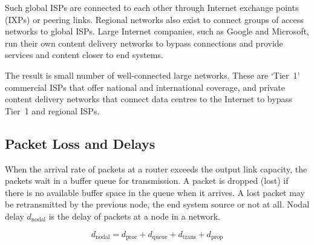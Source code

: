 Such global ISPs are connected to each other through Internet exchange points (IXPs) or peering links.
Regional networks also exist to connect groups of access networks to global ISPs.
Large Internet companies, such as Google and Microsoft, run their own content delivery networks to bypass connections and provide services and content closer to end systems.

The result is small number of well-connected large networks.
These are `Tier~1' commercial ISPs that offer national and international coverage, and private content delivery networks that connect data centres to the Internet to bypass Tier~1 and regional ISPs.

\subsection{Packet Loss and Delays}

When the arrival rate of packets at a router exceeds the output link capacity, the packets wait in a buffer queue for transmission.
A packet is dropped (lost) if there is no available buffer space in the queue when it arrives.
A lost packet may be retransmitted by the previous node, the end system source or not at all.
Nodal delay \( d_{\text{nodal}} \) is the delay of packets at a node in a network.

\begin{equation*}
  d_{\text{nodal}} = d_{\text{proc}} + d_{\text{queue}} + d_{\text{trans}} + d_{\text{prop}}
\end{equation*}

